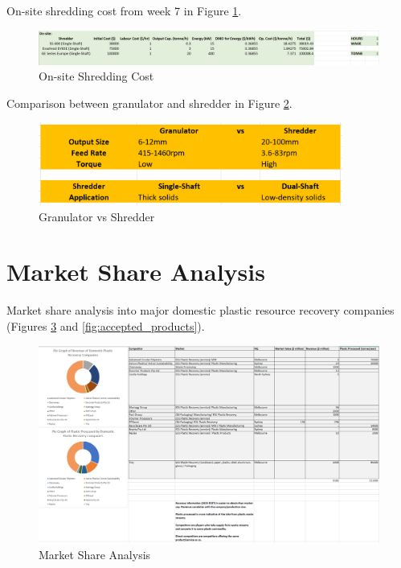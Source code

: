 \documentclass[11pt, a4, nocenter, margin=150mm]{article}
\begin{document}
\begin{appendices}
	On-site shredding cost from week 7 in Figure \ref{fig:shredder_cost}.

	\begin{figure}[h!]
		\centering
		\includegraphics[width=\textwidth]{week7/shredder_cost.png}
		\caption{On-site Shredding Cost}
		\label{fig:shredder_cost}
	\end{figure}

	Comparison between granulator and shredder in Figure \ref{fig:gran_vs_shred}.

	\begin{figure}[h!]
		\centering
		\includegraphics[width=10cm]{week7/granulator_vs_shredder.png}
		\caption{Granulator vs Shredder}
		\label{fig:gran_vs_shred}
	\end{figure}

\pagebreak

\section{Market Share Analysis}
\label{app:market_share}

	Market share analysis into major domestic plastic resource recovery companies (Figures \ref{fig:market_share} and \ref{fig:accepted_products}).

	\begin{figure}[h!]
		\centering
		\includegraphics[width=\textwidth]{week7/domestic_plastic_resource_recovery_market_share.png}
		\caption{Market Share Analysis}
		\label{fig:market_share}
	\end{figure}


\end{appendices}
\end{document}
